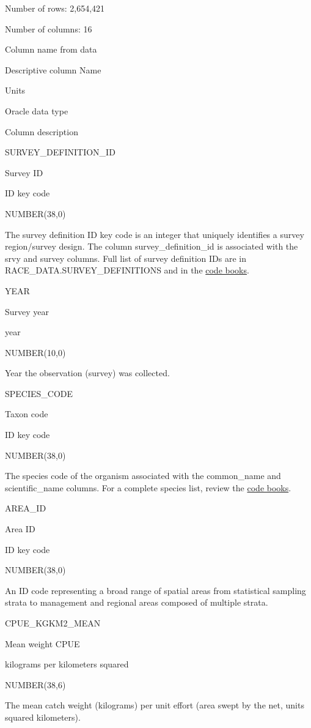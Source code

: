 \documentclass[
  letterpaper,
  oneside,
  open=any]{scrbook}
\begin{document}
Number of rows: 2,654,421

Number of columns: 16

Column name from data

Descriptive column Name

Units

Oracle data type

Column description

SURVEY\_DEFINITION\_ID

Survey ID

ID key code

NUMBER(38,0)

The survey definition ID key code is an integer that uniquely identifies
a survey region/survey design. The column survey\_definition\_id is
associated with the srvy and survey columns. Full list of survey
definition IDs are in RACE\_DATA.SURVEY\_DEFINITIONS and in the
\href{https://www.fisheries.noaa.gov/resource/document/groundfish-survey-species-code-manual-and-data-codes-manual}{code
books}.

YEAR

Survey year

year

NUMBER(10,0)

Year the observation (survey) was collected.

SPECIES\_CODE

Taxon code

ID key code

NUMBER(38,0)

The species code of the organism associated with the common\_name and
scientific\_name columns. For a complete species list, review the
\href{https://www.fisheries.noaa.gov/resource/document/groundfish-survey-species-code-manual-and-data-codes-manual}{code
books}.

AREA\_ID

Area ID

ID key code

NUMBER(38,0)

An ID code representing a broad range of spatial areas from statistical
sampling strata to management and regional areas composed of multiple
strata.

CPUE\_KGKM2\_MEAN

Mean weight CPUE

kilograms per kilometers squared

NUMBER(38,6)

The mean catch weight (kilograms) per unit effort (area swept by the
net, units squared kilometers).
\end{document}
